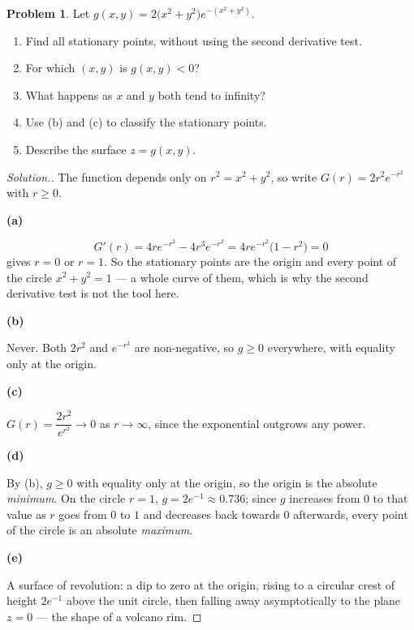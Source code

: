 \documentclass[11pt,a4paper]{article}
\theoremstyle{definition}
\newtheorem{problemx}{Problem}[subsection]
\newenvironment{problem}{\begin{problemx}}{\end{problemx}}
\newenvironment{solution}
  {\renewcommand{\qedsymbol}{}\begin{proof}[\textit{Solution}.]}
  {\end{proof}}
\newcommand{\subhead}[1]{%
  \par\medskip\noindent\textbf{#1}\par\nobreak\smallskip}
\begin{document}
\begin{problem}
Let $g(x,y) = 2\big(x^2+y^2\big)e^{-(x^2+y^2)}$.
\begin{enumerate}
\item[(a)] Find all stationary points, without using the second derivative test.
\item[(b)] For which $(x,y)$ is $g(x,y)<0$?
\item[(c)] What happens as $x$ and $y$ both tend to infinity?
\item[(d)] Use (b) and (c) to classify the stationary points.
\item[(e)] Describe the surface $z = g(x,y)$.
\end{enumerate}
\end{problem}
\begin{solution}
The function depends only on $r^2 = x^2+y^2$, so write
$G(r) = 2r^2e^{-r^2}$ with $r\geq 0$.

\subhead{(a)}
$$G'(r) = 4re^{-r^2} - 4r^3e^{-r^2} = 4re^{-r^2}\big(1-r^2\big) = 0$$
gives $r=0$ or $r=1$. So the stationary points are the origin and every point of
the circle $x^2+y^2 = 1$ --- a whole curve of them, which is why the second
derivative test is not the tool here.

\subhead{(b)}
Never. Both $2r^2$ and $e^{-r^2}$ are non-negative, so $g\geq 0$ everywhere,
with equality only at the origin.

\subhead{(c)}
$G(r) = \dfrac{2r^2}{e^{r^2}}\rightarrow 0$ as $r\rightarrow\infty$, since the
exponential outgrows any power.

\subhead{(d)}
By (b), $g\geq 0$ with equality only at the origin, so the origin is the
absolute \emph{minimum}. On the circle $r=1$, $g = 2e^{-1}\approx 0.736$; since
$g$ increases from $0$ to that value as $r$ goes from $0$ to $1$ and decreases
back towards $0$ afterwards, every point of the circle is an absolute
\emph{maximum}.

\subhead{(e)}
A surface of revolution: a dip to zero at the origin, rising to a circular
crest of height $2e^{-1}$ above the unit circle, then falling away
asymptotically to the plane $z=0$ --- the shape of a volcano rim.
\end{solution}
\end{document}
